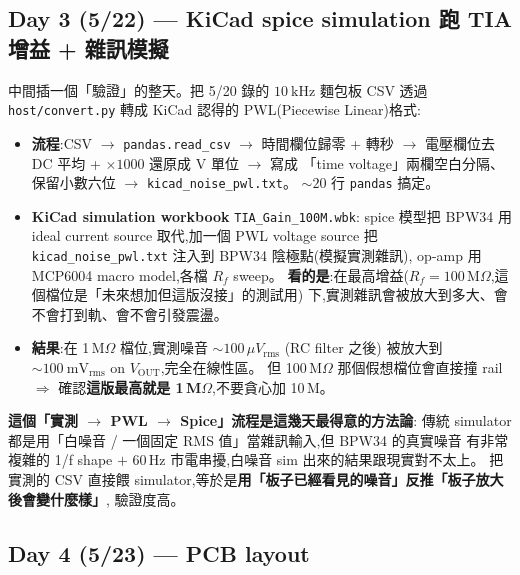 \subsection*{Day 3 (5/22) — KiCad spice simulation 跑 TIA 增益 + 雜訊模擬}

中間插一個「驗證」的整天。把 5/20 錄的 \(\SI{10}{\kilo\hertz}\) 麵包板 CSV
透過 \texttt{host/convert.py} 轉成 KiCad 認得的 PWL(Piecewise Linear)格式:

\begin{itemize}[leftmargin=2em,itemsep=0pt]
  \item \textbf{流程}:CSV \(\to\) \texttt{pandas.read\_csv} \(\to\) 時間欄位歸零 + 轉秒 \(\to\)
        電壓欄位去 DC 平均 + \(\times 1000\) 還原成 V 單位 \(\to\) 寫成
        「time voltage」兩欄空白分隔、保留小數六位 \(\to\) \texttt{kicad\_noise\_pwl.txt}。
        \(\sim 20\) 行 \texttt{pandas} 搞定。
  \item \textbf{KiCad simulation workbook} \texttt{TIA\_Gain\_100M.wbk}:
        spice 模型把 BPW34 用 ideal current source 取代,加一個 PWL voltage source
        把 \texttt{kicad\_noise\_pwl.txt} 注入到 BPW34 陰極點(模擬實測雜訊),
        op-amp 用 MCP6004 macro model,各檔 \(R_f\) sweep。
        \textbf{看的是}:在最高增益(\(R_f = 100\,\mathrm{M}\Omega\),這個檔位是「未來想加但這版沒接」的測試用)
        下,實測雜訊會被放大到多大、會不會打到軌、會不會引發震盪。
  \item \textbf{結果}:在 1\,M\(\Omega\) 檔位,實測噪音 \(\sim 100\,\mu V_\text{rms}\) (RC filter 之後)
        被放大到 \(\sim \SI{100}{\milli\volt}_\text{rms}\) on \(V_\text{OUT}\),完全在線性區。
        但 100\,M\(\Omega\) 那個假想檔位會直接撞 rail \(\Rightarrow\) 確認\textbf{這版最高就是
        1\,M\(\Omega\)},不要貪心加 10\,M。
\end{itemize}

\textbf{這個「實測 \(\to\) PWL \(\to\) Spice」流程是這幾天最得意的方法論}:
傳統 simulator 都是用「白噪音 / 一個固定 RMS 值」當雜訊輸入,但 BPW34 的真實噪音
有非常複雜的 1/f shape \(+\) 60\,Hz 市電串擾,白噪音 sim 出來的結果跟現實對不太上。
把實測的 CSV 直接餵 simulator,等於是\textbf{用「板子已經看見的噪音」反推「板子放大後會變什麼樣」},
驗證度高。

\subsection*{Day 4 (5/23) — PCB layout}

